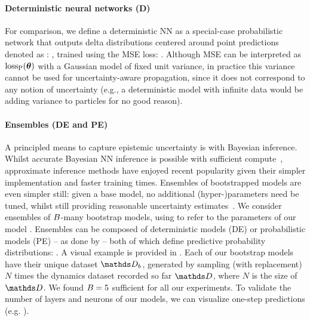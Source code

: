 \paragraph{Deterministic neural networks (D)} 
\label{sec:deterministic}
For comparison, we define a deterministic NN as a special-case probabilistic network that outputs delta distributions centered around point predictions denoted as \smash{$\dynamicsModel_{\parameters}(\MDPState_{\MDPTime}, \MDPAction_{\MDPTime})$}:
, trained using the MSE loss:
.
%
Although MSE can be interpreted as $\text{loss}_{\text{P}}(\boldsymbol{\theta})$ with a Gaussian model of fixed unit variance, in practice this variance cannot be used for uncertainty-aware propagation, since it does not correspond to any notion of uncertainty (e.g., a deterministic model with infinite data would be adding variance to particles for no good reason).

\paragraph{Ensembles (DE and PE)}
A principled means to capture epistemic uncertainty is with Bayesian inference. 
Whilst accurate Bayesian NN inference is possible with sufficient compute~\citep{neal1995bayesian}, approximate inference methods \citep{Blundell2015, gal2017concrete, hernandez2015probabilistic} have enjoyed recent popularity given their simpler implementation and faster training times.
Ensembles of bootstrapped models are even simpler still: given a base model, no additional (hyper-)parameters need be tuned, whilst still providing reasonable uncertainty estimates~\citep{efron1994introduction, Osband2016a,kurutach2018model}.
We consider ensembles of $B$-many bootstrap models, using \smash{$\parameters_\bootstrap$} to refer to the parameters of our  model \smash{$\dynamicsModel_{\parameters_\bootstrap}$}.
Ensembles can be composed of deterministic models (DE) or probabilistic models (PE) -- as done by \citet{Lakshminarayanan2017} -- both of which define predictive probability distributions: 
.
A visual example is provided in .
Each of our bootstrap models have their unique dataset $\D_{\bootstrap}$, generated by sampling (with replacement) $N$ times the dynamics dataset recorded so far $\D$, where $N$ is the size of $\D$. We found $B=5$ sufficient for all our experiments.
To validate the number of layers and neurons of our models, we can visualize one-step predictions (e.g. ).
        
